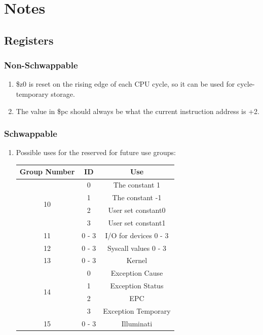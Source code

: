 \documentclass{article}
\begin{document}
\section{Notes}
	\subsection{Registers}
		\subsubsection{Non-Schwappable}
			\begin{enumerate}
				\item \$z0 is reset on the rising edge of each CPU cycle, so it can be used for cycle-temporary storage.
				\item The value in \$pc should always be what the current instruction address is +2.
			\end{enumerate}
		\subsubsection{Schwappable}
			\begin{enumerate}
				\item Possible uses for the reserved for future use groups:
					\begin{center} \begin{tabular}{| c | c | c |} \hline
						Group Number & ID    & Use \\ \hline
						\multirow{4}{*}{10}  & 0 & The constant 1 \\
						             & 1     & The constant -1 \\
						             & 2     & User set constant0 \\
						             & 3     & User set constant1 \\ \hline
						11           & 0 - 3 & I/O for devices 0 - 3 \\ \hline
						12           & 0 - 3 & Syscall values 0 - 3 \\ \hline
						13           & 0 - 3 & Kernel \\ \hline
						\multirow{4}{*}{14}  & 0 & Exception Cause \\
						             & 1     & Exception Status \\
						             & 2     & EPC \\
						             & 3     & Exception Temporary \\ \hline
						15           & 0 - 3 & Illuminati \\ \hline
					\end{tabular} \end{center} 
			\end{enumerate}
\end{document}
